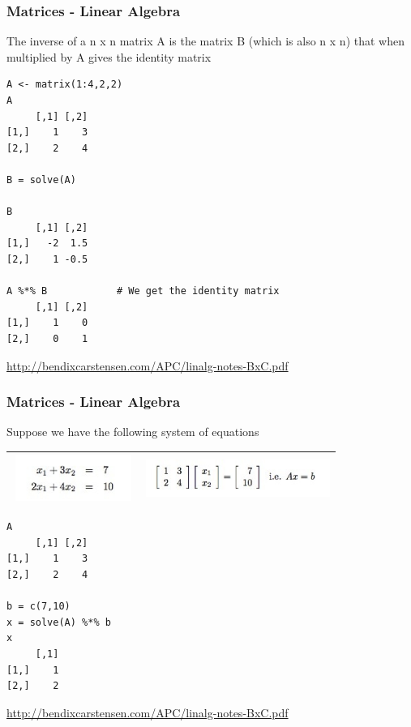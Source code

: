 \documentclass{beamer}
\begin{document}
%

\begin{frame}[fragile]
\frametitle{Matrices - Linear Algebra}
The inverse of a n x n matrix A is the matrix B (which is also n x n) that when multiplied by A gives the identity matrix
\footnotesize
\begin{verbatim}
A <- matrix(1:4,2,2)
A
     [,1] [,2]
[1,]    1    3
[2,]    2    4

B = solve(A)

B
     [,1] [,2]
[1,]   -2  1.5
[2,]    1 -0.5

A %*% B            # We get the identity matrix
     [,1] [,2]
[1,]    1    0
[2,]    0    1
\end{verbatim}
\scriptsize
\url{http://bendixcarstensen.com/APC/linalg-notes-BxC.pdf}
\end{frame}

%

\begin{frame}[fragile]
\frametitle{Matrices - Linear Algebra}
Suppose we have the following system of equations
\begin{tabular}{| l | l |}
  \hline         
  \includegraphics[height=1.5cm,width=4cm]{../IMG/eqn1.png} & \includegraphics[height=1.5cm,width=6cm]{../IMG/eq2.png} \\ \hline  
\end{tabular}

\footnotesize
\begin{verbatim}
A
     [,1] [,2]
[1,]    1    3
[2,]    2    4

b = c(7,10)
x = solve(A) %*% b
x
     [,1]
[1,]    1
[2,]    2
\end{verbatim}
\scriptsize
\url{http://bendixcarstensen.com/APC/linalg-notes-BxC.pdf}
\end{frame}

%
\end{document}
